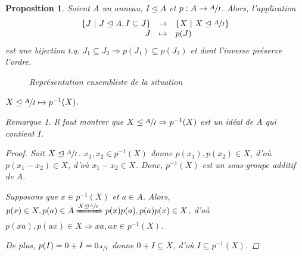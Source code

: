 \documentclass{report}
\newtheorem*{prop}{Proposition}
\theoremstyle{definition}
\theoremstyle{remark}
\newtheorem*{rmq}{Remarque}
\begin{document}
	\begin{prop}
		Soient $A$ un anneau, $I\trianglelefteq A$ et $p:A\to\sfrac{A}{I}$. Alors, l'application \[ \begin{array}{rcl}
			\left\{ J ~\middle|~ J\trianglelefteq A, I\subseteq J \right\} &\to& \left\{ X ~\middle|~ X\trianglelefteq\sfrac{A}{I} \right\}\\
			J &\mapsto& p(J)
		\end{array} \] est une bijection t.q. $J_1\subseteq J_2 \Longrightarrow p(J_1)\subseteq p(J_2)$ et dont l'inverse pr\'eserve l'ordre.

		\begin{figure}[h]
			\centering
			\caption{Repr\'esentation ensembliste de la situation}
		\end{figure}

		$X\trianglelefteq\sfrac{A}{I} \mapsto p^{-1}(X)$.

		\begin{rmq}
			Il faut montrer que $X\trianglelefteq\sfrac{A}{I} \Rightarrow p^{-1}(X)$ est un id\'eal de $A$ qui contient $I$.
		\end{rmq}

		\begin{proof}
			Soit $X\trianglelefteq\sfrac{A}{I}$. $x_1,x_2\in p^{-1}(X)$ donne $p(x_1),p(x_2)\in X$, d'o\`u $p(x_1-x_2)\in X$, d'o\`u $x_1-x_2\in X$. Donc, $p^{-1}(X)$ est un sous-groupe additif de $A$.

			Supposons que $x\in p^{-1}(X)$ et $a\in A$. Alors, $p(x)\in X, p(a)\in A \xRightarrow{X\trianglelefteq\sfrac{A}{I}} p(x)p(a),p(a)p(x) \in X$, d'o\`u $p(xa),p(ax)\in X \Longrightarrow xa,ax\in p^{-1}(X)$.

			De plus, $p(I)=0+I=0_{\sfrac{A}{I}}$ donne $0+I \subseteq X$, d'o\`u $I \subseteq p^{-1}(X)$.
		\end{proof}
	\end{prop}
\end{document}
